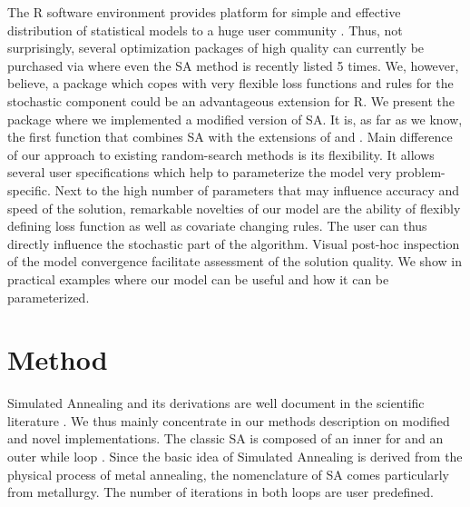 The R software environment provides platform for simple and effective distribution of statistical models to a huge user community \citep{xiang_2013}. Thus, not surprisingly, several optimization packages of high quality can currently be purchased via  \citep{theussl_2016} where even the SA method is recently listed 5 times. We, however, believe, a package which copes with very flexible loss functions and rules for the stochastic component could be an advantageous extension for R. We present the package  where we implemented a modified version of SA. It is, as far as we know, the first function that combines SA with the extensions of \citet{corana_1987} and \citet{pronzato_1984}. Main difference of our approach to existing random-search methods is its flexibility. It allows several user specifications which help to parameterize the model very problem-specific. Next to the high number of parameters that may influence accuracy and speed of the solution, remarkable novelties of our model are the ability of flexibly defining loss function as well as covariate changing rules. The user can thus directly influence the stochastic part of the algorithm. Visual post-hoc inspection of the model convergence facilitate assessment of the solution quality. We show in practical examples where our model can be useful and how it can be parameterized.

\section{Method}
Simulated Annealing and its derivations are well document in the scientific literature \citep[e. g. in][]{hansen_2012,kirkpatrick_1983, xiang_2013}. We thus mainly concentrate in our methods description on modified and novel implementations. The classic SA is composed of an inner for and an outer while loop \citep{kirkpatrick_1983}. Since the basic idea of Simulated Annealing is derived from the physical process of metal annealing, the nomenclature of SA comes particularly from metallurgy. The number of iterations in both loops are user predefined.


